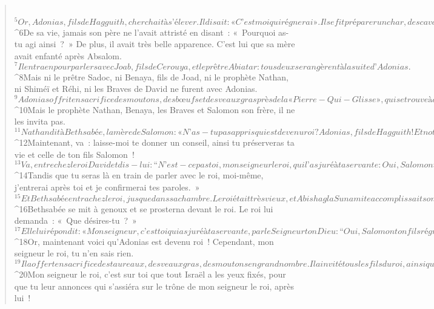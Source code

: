 \begin{verse}
         
${}^{5}Or, Adonias, fils de Hagguith, cherchait à s’élever. Il disait : « C’est moi qui régnerai ». Il se fit préparer un char, des cavaliers, ainsi que cinquante hommes pour courir devant lui. 
${}^{6}De sa vie, jamais son père ne l’avait attristé en disant : « Pourquoi as-tu agi ainsi ? » De plus, il avait très belle apparence. C’est lui que sa mère avait enfanté après Absalom. 
${}^{7}Il entra en pourparlers avec Joab, fils de Cerouya, et le prêtre Abiatar : tous deux se rangèrent à la suite d’Adonias. 
${}^{8}Mais ni le prêtre Sadoc, ni Benaya, fils de Joad, ni le prophète Nathan, ni Shiméï et Réhi, ni les Braves de David ne furent avec Adonias. 
${}^{9}Adonias offrit en sacrifice des moutons, des bœufs et des veaux gras près de la « Pierre-Qui-Glisse », qui se trouve à côté de la source du Foulon. Il invita tous ses frères, les fils du roi, et tous les hommes de Juda qui étaient au service du roi. 
${}^{10}Mais le prophète Nathan, Benaya, les Braves et Salomon son frère, il ne les invita pas.
${}^{11}Nathan dit à Bethsabée, la mère de Salomon : « N’as-tu pas appris qui est devenu roi ? Adonias, fils de Hagguith ! Et notre seigneur David ne le sait pas ! 
${}^{12}Maintenant, va : laisse-moi te donner un conseil, ainsi tu préserveras ta vie et celle de ton fils Salomon ! 
${}^{13}Va, entre chez le roi David et dis-lui : “N’est-ce pas toi, mon seigneur le roi, qui l’as juré à ta servante : Oui, Salomon ton fils régnera après moi et c’est lui qui s’assiéra sur mon trône ? Pourquoi donc Adonias est-il devenu roi ?” 
${}^{14}Tandis que tu seras là en train de parler avec le roi, moi-même, j’entrerai après toi et je confirmerai tes paroles. »
${}^{15}Et Bethsabée entra chez le roi, jusque dans sa chambre. Le roi était très vieux, et Abishag la Sunamite accomplissait son service auprès du roi. 
${}^{16}Bethsabée se mit à genoux et se prosterna devant le roi. Le roi lui demanda : « Que désires-tu ? » 
${}^{17}Elle lui répondit : « Mon seigneur, c’est toi qui as juré à ta servante, par le Seigneur ton Dieu : “Oui, Salomon ton fils régnera après moi : et c’est lui qui s’assiéra sur mon trône.” 
${}^{18}Or, maintenant voici qu’Adonias est devenu roi ! Cependant, mon seigneur le roi, tu n’en sais rien. 
${}^{19}Il a offert en sacrifice des taureaux, des veaux gras, des moutons en grand nombre. Il a invité tous les fils du roi, ainsi que le prêtre Abiatar, et Joab, le chef de l’armée. Mais Salomon, ton serviteur, il ne l’a pas invité. 
${}^{20}Mon seigneur le roi, c’est sur toi que tout Israël a les yeux fixés, pour que tu leur annonces qui s’assiéra sur le trône de mon seigneur le roi, après lui ! 

\end{verse}
